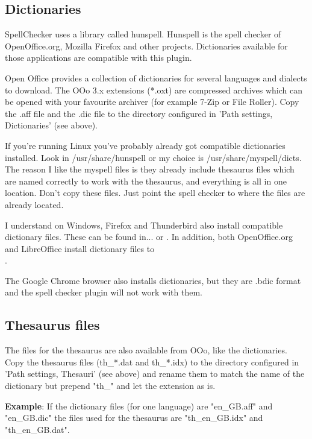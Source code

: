 \subsection{Dictionaries}

SpellChecker uses a library called hunspell. Hunspell is the spell checker of OpenOffice.org, Mozilla Firefox and other projects. Dictionaries available for those applications are compatible with this plugin.

Open Office provides a collection of dictionaries for several languages and dialects to download. The OOo 3.x extensions (*.oxt) are compressed archives which can be opened with your favourite archiver (for example 7-Zip or File Roller). Copy the .aff file and the .dic file to the directory configured in 'Path settings, Dictionaries' (see above).

If you're running Linux you've probably already got compatible dictionaries installed. Look in /usr/share/hunspell or my choice is /usr/share/myspell/dicts. The reason I like the myspell files is they already include thesaurus files which are named correctly to work with the thesaurus, and everything is all in one location. Don't copy these files. Just point the spell checker to where the files are already located.

I understand on Windows, Firefox and Thunderbird also install compatible dictionary files. These can be found in...  or . In addition, both OpenOffice.org and LibreOffice install dictionary files to\\ .

The Google Chrome browser also installs dictionaries, but they are .bdic format and the \codeblocks spell checker plugin will not work with them.

\subsection{Thesaurus files}

The files for the thesaurus are also available from OOo, like the dictionaries. Copy the thesaurus files (th\_*.dat and th\_*.idx) to the directory configured in 'Path settings, Thesauri' (see above) and rename them to match the name of the dictionary but prepend "th\_" and let the extension as is.

\textbf{Example}: If the dictionary files (for one language) are "en\_GB.aff" and "en\_GB.dic" the files used for the thesaurus are "th\_en\_GB.idx" and "th\_en\_GB.dat".

